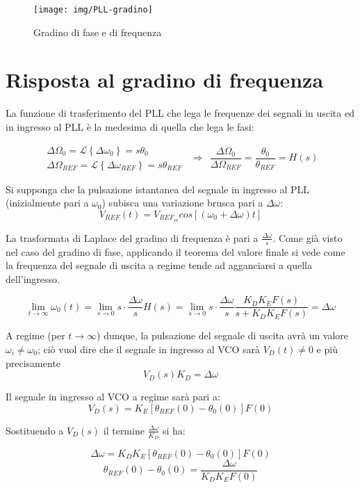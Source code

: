 \begin{figure}[tbh]
	\centering
	\texttt{[image: img/PLL-gradino]}
	\caption{Gradino di fase e di frequenza}
	\label{fig:pll-gradino}
\end{figure}


\section{Risposta al gradino di frequenza}
La funzione di trasferimento del PLL che lega le frequenze dei segnali in uscita ed in ingresso al PLL è la medesima di quella che lega le fasi:

$$\begin{array}{lr}
\Delta \Omega_0 = \mathscr{L} \left\lbrace 
\Delta \omega_0
\right\rbrace=
s \theta_0\\
\Delta \Omega_{REF} = \mathscr{L} \left\lbrace 
\Delta \omega_{REF}
\right\rbrace=
s \theta_{REF}
\end{array}
~~
\Rightarrow
~~
\frac{\Delta \Omega_0}{\Delta \Omega_{REF}} =
\frac{\theta_0}{\theta_{REF}} = H(s)
$$

Si supponga che la pulsazione istantanea del segnale in ingresso al PLL (inizialmente pari a $\omega_0$) subisca una variazione brusca pari a $\Delta \omega$:
$$V_{REF}(t) = V_{{REF}_m} cos \left[ (\omega_0 + \Delta \omega) t \right]
$$

La trasformata di Laplace del gradino di frequenza è pari a $\frac{\Delta \omega}{s}$. Come già visto nel caso del gradino di fase, applicando il teorema del valore finale si vede come la frequenza del segnale di uscita a regime tende ad agganciarsi a quella dell'ingresso.

$$
\lim\limits_{t \rightarrow \infty} \omega_0 (t) = \lim\limits_{s \rightarrow 0} s \cdot \frac{\Delta \omega}{s} H(s) =
\lim\limits_{s \rightarrow 0} s \cdot \frac{\Delta \omega}{s} \frac{K_D K_E F(s)}{s + K_D K_E F(s)}
= \Delta \omega$$

A regime (per $t \rightarrow \infty$) dunque, la pulsazione del segnale di uscita avrà un valore $\omega_i \neq \omega_0$; ciò vuol dire che il segnale in ingresso al VCO sarà $V_D(t) \neq 0$ e più precisamente
\[V_D ( s ) K_D = \Delta\omega \] 

Il segnale in ingresso al VCO a regime sarà pari a:
\[V_D (s) = K_E \left[\theta_{REF} (0) - \theta_0 (0)\right] F(0)\]

Sostituendo a $V_D(s)$ il termine $\frac{\Delta \omega}{K_D}$ si ha:

$$
\Delta \omega = K_D K_E \left[ \theta_{REF}(0) - \theta_0(0) \right] F(0)
$$
$$
\theta_{REF}(0) - \theta_0(0) = \frac{\Delta \omega}{K_D K_E F(0)}
$$

